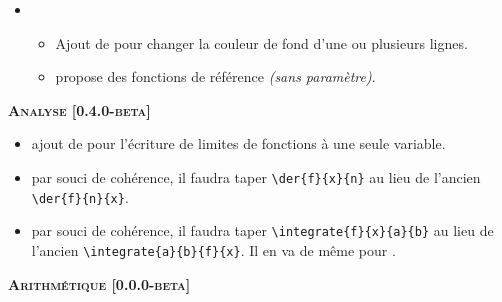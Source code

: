 \documentclass[12pt,a4paper]{book}
\begin{document}
\begin{description}
\begin{itemize}[itemsep=.5em]


    


    \item {}
    \begin{itemize}[itemsep=.5em]
        \item Ajout de  pour changer la couleur de fond d'une ou plusieurs lignes.


        \item {} propose des fonctions de référence \emph{(sans paramètre)}.
    \end{itemize}



    
\end{itemize}


\begin{center}
    \textbf{\textsc{Analyse [0.4.0-beta]}}
\end{center}

\begin{itemize}[itemsep=.5em]
    \item {}
          ajout de  pour l'écriture de limites de fonctions à une seule variable.


    

    \item {}
          par souci de cohérence, il faudra taper \verb#\der{f}{x}{n}# au lieu de l'ancien \verb#\der{f}{n}{x}#.


    

    \item {}
          par souci de cohérence, il faudra taper \verb#\integrate{f}{x}{a}{b}# au lieu de l'ancien \verb#\integrate{a}{b}{f}{x}#.
          Il en va de même pour .


    
\end{itemize}


\separation




\begin{center}
    \textbf{\textsc{Arithmétique [0.0.0-beta]}}
\end{center}


\end{description}
\end{document}
